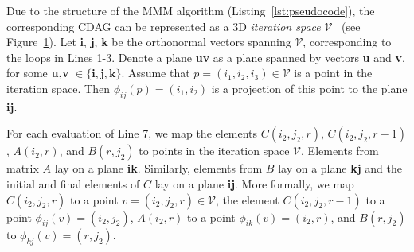 \documentclass[sigplan,review,anonymous,10pt]{acmart}\settopmatter{printfolios=true,printccs=false,printacmref=false}
\begin{document}
\begin{figure}
	\label{fig:iterationSpace}
\end{figure}
%

 Due to the
structure of the MMM algorithm (Listing~\ref{lst:pseudocode}), the 
corresponding 
CDAG can be represented as a 3D \emph{iteration
space} $\mathcal{V}$~\cite{tiling} (see Figure~\ref{fig:iterationSpace}). Let 
\textbf{i}, \textbf{j}, \textbf{k} be the orthonormal vectors spanning 
$\mathcal{V}$,
corresponding to the loops in Lines 1-3.  Denote a plane \textbf{uv} as a
plane spanned by vectors \textbf{u} and \textbf{v}, for some \textbf{u,v} $\in
\{\mathbf{i,j,k}\}$. Assume that $p = (i_1,i_2,i_3) \in \mathcal{V}$ is a point
in the iteration space. Then $\phi_{ij}(p) = (i_1,i_2)$ is a projection of this
point to the plane \textbf{ij}.

For each evaluation of Line 7, we map the elements \linebreak $C(i_2,j_2,r)$, 
$C(i_2,j_2,r-1)$, $A(i_2,r)$, and $B(r,j_2)$ to points in the iteration space 
$\mathcal{V}$. Elements from matrix $A$ lay on a plane \textbf{ik}. Similarly, 
elements from $B$ lay on a plane \textbf{kj} and the initial and final elements 
of $C$ lay on a plane \textbf{ij}. More formally, we map
$C(i_2,j_2,r)$ to a point
$v = (i_2,j_2,r) \in \mathcal{V}$, the element $C(i_2,j_2,r-1)$ to a point 
$\phi_{ij}(v) =
(i_2,j_2)$, $A(i_2,r)$ to a point $\phi_{ik}(v) = (i_2,r)$, and $B(r,j_2)$
to $\phi_{kj}(v) = (r,j_2)$.
\end{document}
